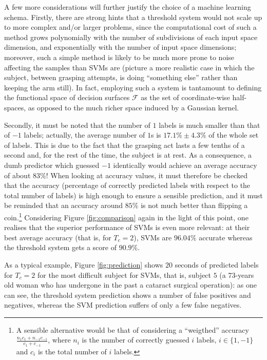 \documentclass[a4paper,10pt,conference]{ieeeconf}
\begin{document}
A few more considerations will further justify the choice of a machine
learning schema. Firstly, there are strong hints that a threshold
system would not scale up to more complex and/or larger problems,
since the computational cost of such a method grows polynomially with
the number of subdivisions of each input space dimension, and
exponentially with the number of input space dimensions; moreover,
such a simple method is likely to be much more prone to noise
affecting the samples than SVMs are (picture a more realistic case in
which the subject, between grasping attempts, is doing ``something
else'' rather than keeping the arm still). In fact, employing such a
system is tantamount to defining the functional space of decision
surfaces $\mathcal{F}$ as the set of coordinate-wise half-spaces, as
opposed to the much richer space induced by a Gaussian kernel.

Secondly, it must be noted that the number of $1$ labels is much
smaller than that of $-1$ labels; actually, the average number of $1$s
is $17.1\% \pm 4.3\%$ of the whole set of labels. This is due to the
fact that the grasping act lasts a few tenths of a second and, for the
rest of the time, the subject is at rest.  As a consequence, a dumb
predictor which guessed $-1$ identically would achieve an average
accuracy of about $83\%$! When looking at accuracy values, it must
therefore be checked that the accuracy (percentage of correctly
predicted labels with respect to the total number of labels) is high
enough to ensure a sensible prediction, and it must be reminded that
an accuracy around $85\%$ is not much better than flipping a
coin.\footnote{A sensible alternative would be that of considering a
``weigthed'' accuracy $\frac{n_1 c_1 + n_{-1} c_{-1}}{c_1+c_{-1}}$,
where $n_i$ is the number of correctly guessed $i$ labels, $i \in
\{1,-1\}$ and $c_i$ is the total number of $i$ labels.} Considering
Figure \ref{fig:comparison} again in the light of this point, one
realises that the superior performance of SVMs is even more relevant:
at their best average accuracy (that is, for $T_c=2$), SVMs are
$96.04\%$ accurate whereas the threshold system gets a score of
$90.9\%$.

As a typical example, Figure \ref{fig:prediction} shows $20$ seconds
of predicted labels for $T_c=2$ for the most difficult subject for
SVMs, that is, subject $5$ (a 73-years old woman who has undergone in
the past a cataract surgical operation): as one can see, the threshold
system prediction shows a number of false positives and negatives,
whereas the SVM prediction suffers of only a few false negatives.
\end{document}
